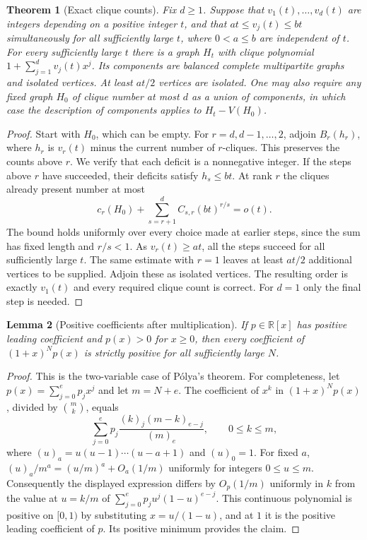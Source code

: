 \documentclass[11pt,a4paper]{article}
\newtheorem{theorem}{Theorem}[section]
\newtheorem{lemma}[theorem]{Lemma}
\begin{document}
\begin{theorem}[Exact clique counts]\label{thm:linear-clique-counts}
Fix $d\ge1$. Suppose that $v_1(t),\ldots,v_d(t)$ are integers depending
on a positive integer $t$, and that $a t\le v_j(t)\le b t$ simultaneously
for all sufficiently large $t$, where $0<a\le b$ are independent of $t$.
For every sufficiently large $t$ there is a graph $H_t$ with clique
polynomial $1+\sum_{j=1}^d v_j(t)x^j$. Its components are balanced
complete multipartite graphs and isolated vertices. At least $at/2$ vertices
are isolated. One may also require any fixed graph $H_0$ of clique number
at most $d$ as a union of components, in which case the description of
components applies to $H_t-V(H_0)$.
\end{theorem}
\begin{proof}
Start with $H_0$, which can be empty. For $r=d,d-1,\ldots,2$, adjoin
$B_r(h_r)$, where $h_r$ is $v_r(t)$ minus the current number of
$r$-cliques. This preserves the counts above $r$. We verify that each
deficit is a nonnegative integer. If the steps above $r$ have succeeded,
their deficits satisfy $h_s\le bt$. At rank $r$ the cliques already
present number at most
\[
 c_r(H_0)+\sum_{s=r+1}^d C_{s,r}(bt)^{r/s}=o(t).
\]
The bound holds uniformly over every choice made at earlier steps, since
the sum has fixed length and $r/s<1$. As $v_r(t)\ge at$, all the steps
succeed for all sufficiently large $t$. The same estimate with $r=1$
leaves at least $at/2$ additional vertices to be supplied. Adjoin these
as isolated vertices. The resulting order is exactly $v_1(t)$ and every
required clique count is correct. For $d=1$ only the final step is needed.
\end{proof}

\begin{lemma}[Positive coefficients after multiplication]\label{lem:factor-positivity}
If $p\in\mathbb{R}[x]$ has positive leading coefficient and
$p(x)>0$ for $x\ge0$, then every coefficient of $(1+x)^N p(x)$ is
strictly positive for all sufficiently large $N$.
\end{lemma}
\begin{proof}
This is the two-variable case of P\'olya's theorem. For completeness,
let $p(x)=\sum_{j=0}^e p_jx^j$ and let $m=N+e$. The coefficient of
$x^k$ in $(1+x)^Np(x)$, divided by $\binom mk$, equals
\[
 \sum_{j=0}^{e} p_j
 \frac{(k)_j(m-k)_{e-j}}{(m)_e},
 \qquad 0\le k\le m,
\]
where $(u)_a=u(u-1)\cdots(u-a+1)$ and $(u)_0=1$. For fixed $a$,
$(u)_a/m^a=(u/m)^a+O_a(1/m)$ uniformly for integers $0\le u\le m$.
Consequently the displayed expression differs by $O_p(1/m)$ uniformly
in $k$ from the value at $u=k/m$ of
$\sum_{j=0}^{e} p_j u^j(1-u)^{e-j}$. This continuous polynomial is
positive on $[0,1)$ by substituting $x=u/(1-u)$, and at $1$ it is the
positive leading coefficient of $p$. Its positive minimum provides the
claim.
\end{proof}
\end{document}
